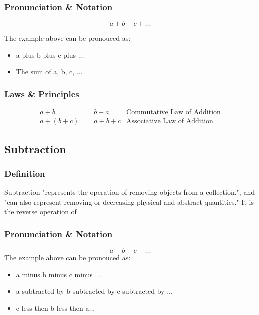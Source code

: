 \documentclass{article}
\begin{document}
    \subsubsection{Pronunciation \& Notation}
    $$a + b + c + ... $$
    \par
    The example above can be pronouced as:
    \begin{itemize}
        \item a plus b plus c plus ...
        \item The sum of a, b, c, ...
    \end{itemize}

    \subsubsection{Laws \& Principles}
    \begin{align*}
        a + b &= b + a &\text{Commutative Law of Addition}\\
        a + (b + c) &= a + b + c &\text{Associative Law of Addition}
    \end{align*}

    \subsection{Subtraction}
    \label{section:subtraction}

    \subsubsection{Definition}
    \par
    Subtraction "represents the operation of removing objects from a collection.", and "can also represent removing or decreasing physical and abstract quantities." \cite{subtraction} It is the reverse operation of .
    \par

    \subsubsection{Pronunciation \& Notation}
    $$a - b - c - ... $$
    The example above can be pronouced as:
    \begin{itemize}
        \item a minus b minus c minus ...
        \item a subtracted by b subtracted by c subtracted by ...
        \item c less then b less then a...
    \end{itemize}
\end{document}
